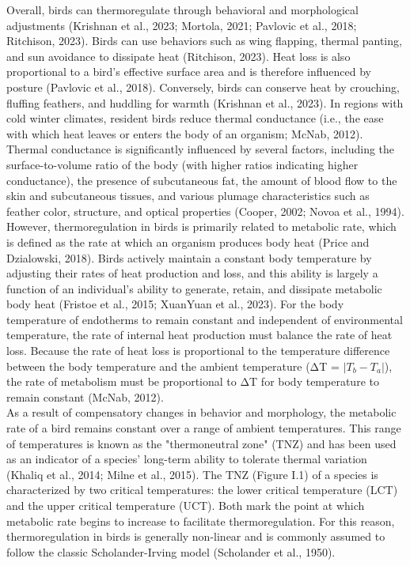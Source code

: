 \documentclass[10pt, twoside]{book} %
\begin{document}
\noindent Overall, birds can thermoregulate through behavioral and morphological adjustments (Krishnan et al., 2023; Mortola, 2021; Pavlovic et al., 2018; Ritchison, 2023). Birds can use behaviors such as wing flapping, thermal panting, and sun avoidance to dissipate heat (Ritchison, 2023). Heat loss is also proportional to a bird's effective surface area and is therefore influenced by posture (Pavlovic et al., 2018). Conversely, birds can conserve heat by crouching, fluffing feathers, and huddling for warmth (Krishnan et al., 2023). In regions with cold winter climates, resident birds reduce thermal conductance (i.e., the ease with which heat leaves or enters the body of an organism; McNab, 2012). Thermal conductance is significantly influenced by several factors, including the surface-to-volume ratio of the body (with higher ratios indicating higher conductance), the presence of subcutaneous fat, the amount of blood flow to the skin and subcutaneous tissues, and various plumage characteristics such as feather color, structure, and optical properties (Cooper, 2002; Novoa et al., 1994).\\

	However, thermoregulation in birds is primarily related to metabolic rate, which is defined as the rate at which an organism produces body heat (Price and Dzialowski, 2018). Birds actively maintain a constant body temperature by adjusting their rates of heat production and loss, and this ability is largely a function of an individual's ability to generate, retain, and dissipate metabolic body heat (Fristoe et al., 2015; XuanYuan et al., 2023). For the body temperature of endotherms to remain constant and independent of environmental temperature, the rate of internal heat production must balance the rate of heat loss. Because the rate of heat loss is proportional to the temperature difference between the body temperature and the ambient temperature (ΔT = \( \lvert T_{b} - T_{a} \rvert \)), the rate of metabolism must be proportional to ΔT for body temperature to remain constant (McNab, 2012).\\

As a result of compensatory changes in behavior and morphology, the metabolic rate of a bird remains constant over a range of ambient temperatures. This range of temperatures is known as the "thermoneutral zone" (TNZ) and has been used as an indicator of a species' long-term ability to tolerate thermal variation (Khaliq et al., 2014; Milne et al., 2015). The TNZ (Figure I.1) of a species is characterized by two critical temperatures: the lower critical temperature (LCT) and the upper critical temperature (UCT). Both mark the point at which metabolic rate begins to increase to facilitate thermoregulation. For this reason, thermoregulation in birds is generally non-linear and is commonly assumed to follow the classic Scholander-Irving model (Scholander et al., 1950).\\
\end{document}
